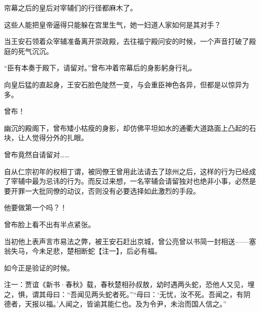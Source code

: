 帘幕之后的皇后对宰辅们的行径都麻木了。

这些人能把皇帝逼得只能躲在宫里生气，她一妇道人家如何是其对手？

当王安石领着众宰辅准备离开崇政殿，去往福宁殿问安的时候，一个声音打破了殿庭的死气沉沉。

“臣有本奏于殿下，请留对。”曾布冲着帘幕后的身影躬身行礼。

向皇后猛的直起身，王安石脸色陡然一变，与会重臣神色各异，但都是以惊异为多。

曾布！

幽沉的殿阁下，曾布矮小枯瘦的身影，却仿佛平坦如水的通衢大道路面上凸起的石块，让人觉得分外的扎眼。

曾布竟然自请留对……

自从仁宗初年的权相丁谓，被同僚王曾用此法请去了琼州之后，这样的行为已经成了宰辅中最为忌讳的行为。而反过来想，一名宰辅会请留独对也绝非小事，必然是要开罪一大批同僚的动议，否则没有必要选择如此激烈的手段。

他要做第一个吗？！

曾布脸上看不出有半点紧张。

当初他上表声言市易法之弊，被王安石赶出京城，曾公亮曾以书简一封相送——塞翁失马，今未足悲，楚相断蛇【注一】，后必有福。

如今正是验证的时候。

注一：贾谊《新书·春秋》载，春秋楚相孙叔敖，幼时遇两头蛇，恐他人又见，埋之，惧，谓其母曰：“吾闻见两头蛇者死。”“母曰：‘无忧，汝不死。吾闻之，有阴德者，天报以福。’人闻之，皆谕其能仁也。及为令尹，未治而国人信之。”

